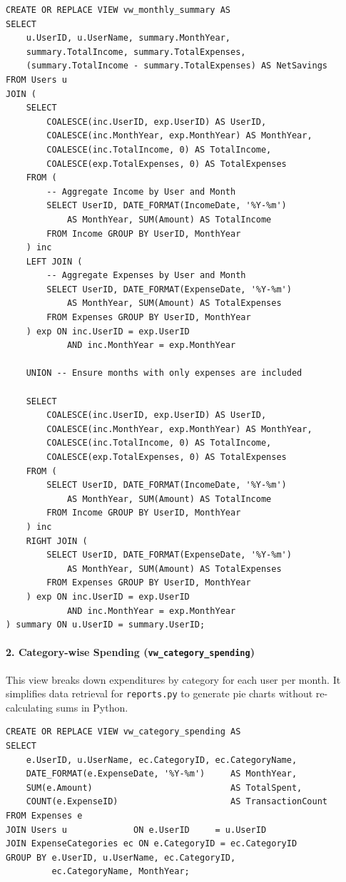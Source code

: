 \documentclass[12pt, a4paper]{article}
\begin{document}
\begin{lstlisting}[style=sqlstyle, caption={vw\_monthly\_summary View (excerpt)}]
CREATE OR REPLACE VIEW vw_monthly_summary AS
SELECT 
    u.UserID, u.UserName, summary.MonthYear, 
    summary.TotalIncome, summary.TotalExpenses,
    (summary.TotalIncome - summary.TotalExpenses) AS NetSavings
FROM Users u
JOIN (
    SELECT 
        COALESCE(inc.UserID, exp.UserID) AS UserID,
        COALESCE(inc.MonthYear, exp.MonthYear) AS MonthYear,
        COALESCE(inc.TotalIncome, 0) AS TotalIncome,
        COALESCE(exp.TotalExpenses, 0) AS TotalExpenses
    FROM (
        -- Aggregate Income by User and Month
        SELECT UserID, DATE_FORMAT(IncomeDate, '%Y-%m') 
            AS MonthYear, SUM(Amount) AS TotalIncome 
        FROM Income GROUP BY UserID, MonthYear
    ) inc
    LEFT JOIN (
        -- Aggregate Expenses by User and Month
        SELECT UserID, DATE_FORMAT(ExpenseDate, '%Y-%m') 
            AS MonthYear, SUM(Amount) AS TotalExpenses 
        FROM Expenses GROUP BY UserID, MonthYear
    ) exp ON inc.UserID = exp.UserID 
            AND inc.MonthYear = exp.MonthYear
    
    UNION -- Ensure months with only expenses are included
    
    SELECT 
        COALESCE(inc.UserID, exp.UserID) AS UserID,
        COALESCE(inc.MonthYear, exp.MonthYear) AS MonthYear,
        COALESCE(inc.TotalIncome, 0) AS TotalIncome,
        COALESCE(exp.TotalExpenses, 0) AS TotalExpenses
    FROM (
        SELECT UserID, DATE_FORMAT(IncomeDate, '%Y-%m') 
            AS MonthYear, SUM(Amount) AS TotalIncome 
        FROM Income GROUP BY UserID, MonthYear
    ) inc
    RIGHT JOIN (
        SELECT UserID, DATE_FORMAT(ExpenseDate, '%Y-%m') 
            AS MonthYear, SUM(Amount) AS TotalExpenses 
        FROM Expenses GROUP BY UserID, MonthYear
    ) exp ON inc.UserID = exp.UserID 
            AND inc.MonthYear = exp.MonthYear
) summary ON u.UserID = summary.UserID;
\end{lstlisting}

\paragraph{2. Category-wise Spending (\texttt{vw\_category\_spending})}

This view breaks down expenditures by category for each user per month.
It simplifies data retrieval for \texttt{reports.py} to generate pie charts
without re-calculating sums in Python.

\begin{lstlisting}[style=sqlstyle, caption={vw\_category\_spending View}]
CREATE OR REPLACE VIEW vw_category_spending AS
SELECT
    e.UserID, u.UserName, ec.CategoryID, ec.CategoryName,
    DATE_FORMAT(e.ExpenseDate, '%Y-%m')     AS MonthYear,
    SUM(e.Amount)                           AS TotalSpent,
    COUNT(e.ExpenseID)                      AS TransactionCount
FROM Expenses e
JOIN Users u             ON e.UserID     = u.UserID
JOIN ExpenseCategories ec ON e.CategoryID = ec.CategoryID
GROUP BY e.UserID, u.UserName, ec.CategoryID, 
         ec.CategoryName, MonthYear;
\end{lstlisting}
\end{document}
